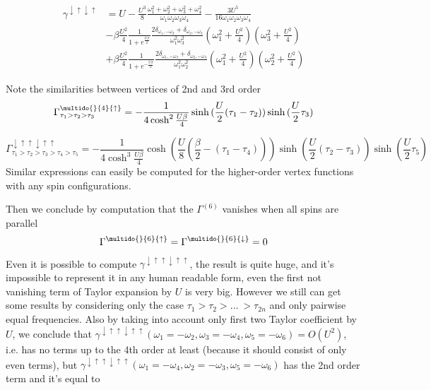\begin{equation}\begin{aligned}
 \label{gamma4anti}
 \gamma^{\downarrow\uparrow\downarrow\uparrow} & = 
 U - \frac{U^3}{8}\frac{\omega_1^2+\omega_2^2+\omega_3^2+\omega_4^2}{\omega_1\omega_2\omega_3\omega_4}
   - \frac{3U^5}{16\omega_1\omega_2\omega_3\omega_4} \\
  &- \beta\frac{U^2}{4}\frac{1}{1+e^{\frac{U\beta}{2}}}\frac{2\delta_{\omega_1,-\omega_2}+\delta_{\omega_2,-\omega_3}}{\omega_1^2\omega_3^2}(\omega_1^2+\frac{U^2}{4})(\omega_3^2+\frac{U^2}{4}) \\
  &+ \beta\frac{U^2}{4}\frac{1}{1+e^{-\frac{U\beta}{2}}}\frac{2\delta_{\omega_1,-\omega_3}+\delta_{\omega_2,-\omega_3}}{\omega_1^2\omega_2^2}(\omega_1^2+\frac{U^2}{4})(\omega_2^2+\frac{U^2}{4})   
\end{aligned}\end{equation}

Note the similarities between vertices of 2nd and 3rd order 
\begin{equation}
 \label{Gamma4}
 \Gamma_{\tau_1>\tau_2>\tau_3}^{\multido{}{4}{\uparrow}} = -\frac{1}{4\cosh^2{\frac{U\beta}{4}}}\sinh{(\frac{U}{2}(\tau_1-\tau_2))}\sinh{(\frac{U}{2}\tau_3)}
\end{equation}

\begin{equation}
\label{Gamma6}
 \Gamma_{\tau_1>\tau_2>\tau_3>\tau_4>\tau_5}^{\downarrow\uparrow\uparrow\downarrow\uparrow\uparrow} = 
    -\frac{1}{4\cosh^3{\frac{U\beta}{4}}}\cosh{(\frac{U}{8}(\frac{\beta}{2}-(\tau_1-\tau_4)))}
      \sinh{(\frac{U}{2}(\tau_2-\tau_3))}\sinh{(\frac{U}{2}\tau_5)}
\end{equation}
Similar expressions can easily be computed for the higher-order vertex functions with any spin configurations.

Then we conclude by computation that the $\Gamma^{(6)}$ vanishes when all spins are parallel
\begin{equation}
 \Gamma^{\multido{}{6}{\uparrow}} = \Gamma^{\multido{}{6}{\downarrow}} = 0
\end{equation}

Even it is possible to compute $\gamma^{\downarrow\uparrow\uparrow\downarrow\uparrow\uparrow}$,
 the result is quite huge, and it's impossible to represent it in any human readable form, even the first not vanishing term of Taylor expansion by $U$ is very big.
However we still can get some results by considering only the case $\tau_1>\tau_2>\dots\ >\tau_{2n}$ and only pairwise equal frequencies.
Also by taking into account only first two Taylor coefficient by $U$, we conclude that
 $\gamma^{\downarrow\uparrow\uparrow\downarrow\uparrow\uparrow}(\omega_1=-\omega_2,\omega_3=-\omega_4,\omega_5=-\omega_6) = O(U^2)$,
 i.e. has no terms up to the 4th order at least (because it should consist of only even terms), but
 $\gamma^{\downarrow\uparrow\uparrow\downarrow\uparrow\uparrow}(\omega_1=-\omega_4,\omega_2=-\omega_3,\omega_5=-\omega_6)$ has the 2nd order term and it's equal to

